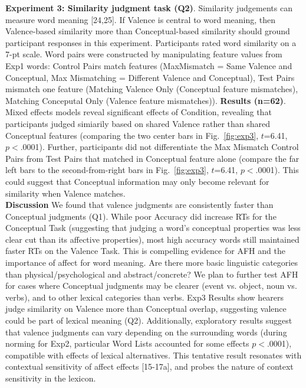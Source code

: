 \noindent \textbf{Experiment 3: Similarity judgment task (Q2)}. Similarity judgements can measure word meaning [24,25]. If Valence is central to word meaning, then Valence-based similarity more than Conceptual-based similarity should ground participant responses in this experiment. Participants rated word similarity on a 7-pt scale. Word pairs were constructed by manipulating feature values from Exp1 words: Control Pairs match features (MaxMismatch = Same Valence and Conceptual, Max Mismatching = Different Valence and Conceptual), Test Pairs mismatch one feature (Matching Valence Only (Conceptual feature mismatches), Matching Conceputal Only (Valence feature mismatches)). \textbf{Results (n=62)}. Mixed effects models reveal significant effects of Condition, revealing that participants judged simiarily based on shared Valence rather than shared Conceptual features (comparing the two center bars in Fig.~\ref{fig:exp3}, $t$=6.41, $p<$.0001). Further, participants did not differentiate the Max Mismatch Control Pairs from Test Pairs that matched in Conceptual feature alone (compare the far left bars to the second-from-right bars in Fig.~\ref{fig:exp3}, $t$=6.41, $p<$.0001). This could suggest that Conceptual information may only become relevant for similarity when Valence matches. \\


\noindent \textbf{Discussion}
We found that valence judgments are consistently faster than Conceptual judgments (Q1). While poor Accuracy did increase RTs for the Conceptual Task (suggesting that judging a word's conceptual properties was less clear cut than its affective properties), most high accuracy words still maintained faster RTs on the Valence Task. This is compelling evidence for AFH and the importance of affect for word meaning. Are there more basic linguistic categories than physical/psychological and abstract/concrete? We plan to further test AFH for cases where Conceptual judgments may be clearer (event vs. object, noun vs. verbs), and to other lexical categories than verbs. Exp3 Results show hearers judge similarity on Valence more than Conceptual overlap, suggesting valence could be part of lexical meaning (Q2). Additionally, exploratory results suggest that valence judgments can vary depending on the surrounding words (during norming for Exp2, particular Word Lists accounted for some effects %
$p<$.0001), compatible with effects of lexical alternatives. This tentative result resonates with contextual sensitivity of affect effects [15-17a], and probes the nature of context sensitivity in the lexicon.

